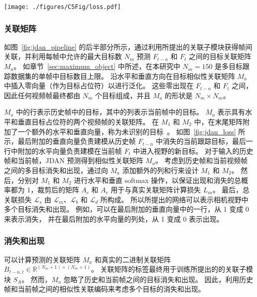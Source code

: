 \begin{figure*}[ht]
	\centering
	\texttt{[image: ./figures/C5Fig/loss.pdf]}
	\vspace{0.2em}
	\caption{目标消失和出现的处理}
	\label{fig:jdan_loss}
\end{figure*}


\subsubsection{关联矩阵} \label{sec:association_matrix}
如图~\ref{fig:jdan_pipeline} 的后半部分所示，通过利用所提出的关联子模块获得帧间关联，并利用每帧中允许的最大目标数 $N_m$ 预测 $F_{t-n}$ 和 $F_t$ 之间的目标关联矩阵 $M_a$。
如章节~\ref{sec:maximum_object} 中所述，在本研究中 $N_m = 150$ 是多目标跟踪数据集的单帧中目标数目上限。
沿水平和垂直方向在目标相似性关联矩阵 $M_a$ 中插入零向量（作为目标占位符）以进行泛化。
这些零出现在 $F_{t-n}$ 和 $F_t$ 之间，因此任何视频帧最终都由 $N_m$ 个目标组成，并且 $M_a$ 的形状是 $N_m \times N_m$。

$M_a$ 中的行表示历史帧中的目标，其中的列表示当前帧中的目标。
$M_a$ 表示具有水平和垂直目标占位符的两个视频帧的关联矩阵。
在 $M_1$ 和 $M_2$ 中，在末尾矩阵附加了一个额外的水平和垂直向量，称为未识别的目标~\cite{dan}。
如图~\ref{fig:jdan_loss} 所示，最后附加的垂直向量负责建模从历史帧 $F_{t-n}$ 中消失的当前跟踪目标，最后一行中附加的水平向量负责建模在当前帧 $F_t$ 中进入视野的新目标。
对于输入的历史帧和当前帧，JDAN 预测得到相似性关联矩阵 $M_a$。
考虑到历史帧和当前视频帧之间的多目标消失和出现，通过向 $M_a$ 添加额外的列和行来设计 $M_1$ 和 $M_2$。
然后，分别对 $M_1$ 和 $M_2$ 进行水平和垂直 softmax 操作，以保证出现和消失的总概率都为 1，裁剪后的矩阵 $A_c$ 和 $A_r$ 用于与真实关联矩阵计算损失 $ L_m $。
最后，总关联损失 $\mathcal{L}_s$ 由 $\mathcal L_m$、$\mathcal L_b$ 和 $\mathcal L_d$ 所构成。
所以所提出的网络可以表示相机视野中多个目标消失和出现。
例如，可以在最后附加的垂直向量中的一行，从 1 变成 0 来表示消失，
并在最后附加的水平向量的列处，从 1 变成 0 表示出现。



\subsubsection{消失和出现} \label{sec:similarity_loss}
可以计算预测的关联矩阵 $M_a$ 和真实的二进制关联矩阵 $B_{t-n,t} \in \mathbb{R}^{(N_m+1) \times ( N_m+1)}$。
关联矩阵的标签最终用于训练所提出的的关联子模块 $S_A$。
然而，$M_a$ 忽略了历史和当前帧之间的目标消失和出现。
因此，利用历史帧和当前帧之间的相似性关联编码来考虑多个目标的消失和出现。

